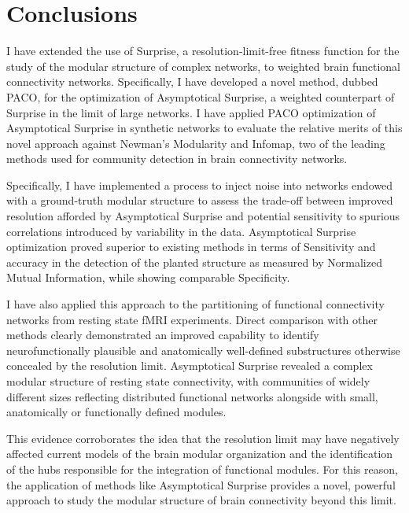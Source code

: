 \section{Conclusions}
I have extended the use of Surprise, a resolution-limit-free fitness function for the study of the modular structure of complex networks, to weighted brain functional connectivity networks.
Specifically, I have developed a novel method, dubbed PACO, for the optimization of Asymptotical Surprise, a weighted counterpart of Surprise in the limit of large networks.
I have applied PACO optimization of Asymptotical Surprise in synthetic networks to evaluate the relative merits of this novel approach against Newman's Modularity and Infomap, two of the leading methods used for community detection in brain connectivity networks.

Specifically, I have implemented a process to inject noise into networks endowed with a ground-truth modular structure to assess the trade-off between improved resolution afforded by Asymptotical Surprise and potential sensitivity to spurious correlations introduced by variability in the data.
Asymptotical Surprise optimization proved superior to existing methods in terms of Sensitivity and accuracy in the detection of the planted structure as measured by Normalized Mutual Information, while showing comparable Specificity.

I have also applied this approach to the partitioning of functional connectivity networks from resting state fMRI experiments.
Direct comparison with other methods clearly demonstrated an improved capability to identify neurofunctionally plausible and anatomically well-defined substructures otherwise concealed by the resolution limit.
Asymptotical Surprise revealed a complex modular structure of resting state connectivity, with communities of widely different sizes reflecting distributed functional networks alongside with small, anatomically or functionally defined modules.

This evidence corroborates the idea that the resolution limit may have negatively affected current models of the brain modular organization and the identification of the hubs responsible for the integration of functional modules.
For this reason, the application of methods like Asymptotical Surprise provides a novel, powerful approach to study the modular structure of brain connectivity beyond this limit.

